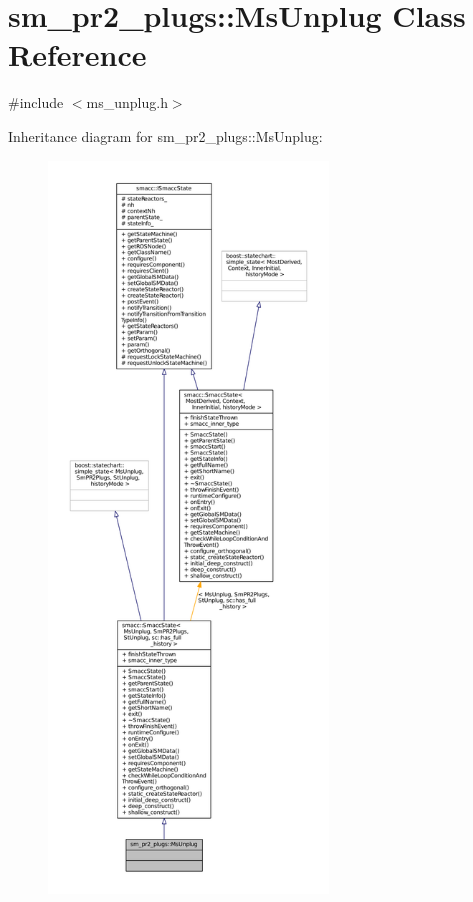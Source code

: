 \hypertarget{classsm__pr2__plugs_1_1MsUnplug}{}\section{sm\+\_\+pr2\+\_\+plugs\+:\+:Ms\+Unplug Class Reference}
\label{classsm__pr2__plugs_1_1MsUnplug}


{\ttfamily \#include $<$ms\+\_\+unplug.\+h$>$}



Inheritance diagram for sm\+\_\+pr2\+\_\+plugs\+:\+:Ms\+Unplug\+:
\nopagebreak
\begin{figure}[H]
\begin{center}
\leavevmode
\includegraphics[height=550pt]{classsm__pr2__plugs_1_1MsUnplug__inherit__graph}
\end{center}
\end{figure}


